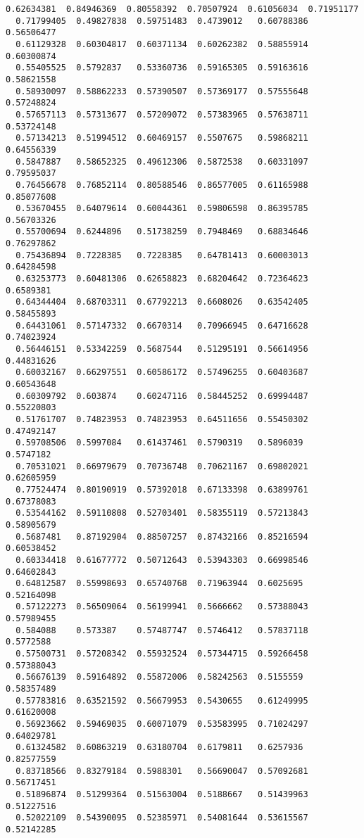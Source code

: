 \documentclass[11pt]{article}
\begin{document}
\begin{Verbatim}[commandchars=\\\{\}]
  0.62634381  0.84946369  0.80558392  0.70507924  0.61056034  0.71951177
  0.71799405  0.49827838  0.59751483  0.4739012   0.60788386  0.56506477
  0.61129328  0.60304817  0.60371134  0.60262382  0.58855914  0.60300874
  0.55405525  0.5792837   0.53360736  0.59165305  0.59163616  0.58621558
  0.58930097  0.58862233  0.57390507  0.57369177  0.57555648  0.57248824
  0.57657113  0.57313677  0.57209072  0.57383965  0.57638711  0.53724148
  0.57134213  0.51994512  0.60469157  0.5507675   0.59868211  0.64556339
  0.5847887   0.58652325  0.49612306  0.5872538   0.60331097  0.79595037
  0.76456678  0.76852114  0.80588546  0.86577005  0.61165988  0.85077608
  0.53670455  0.64079614  0.60044361  0.59806598  0.86395785  0.56703326
  0.55700694  0.6244896   0.51738259  0.7948469   0.68834646  0.76297862
  0.75436894  0.7228385   0.7228385   0.64781413  0.60003013  0.64284598
  0.63253773  0.60481306  0.62658823  0.68204642  0.72364623  0.6589381
  0.64344404  0.68703311  0.67792213  0.6608026   0.63542405  0.58455893
  0.64431061  0.57147332  0.6670314   0.70966945  0.64716628  0.74023924
  0.56446151  0.53342259  0.5687544   0.51295191  0.56614956  0.44831626
  0.60032167  0.66297551  0.60586172  0.57496255  0.60403687  0.60543648
  0.60309792  0.603874    0.60247116  0.58445252  0.69994487  0.55220803
  0.51761707  0.74823953  0.74823953  0.64511656  0.55450302  0.47492147
  0.59708506  0.5997084   0.61437461  0.5790319   0.5896039   0.5747182
  0.70531021  0.66979679  0.70736748  0.70621167  0.69802021  0.62605959
  0.77524474  0.80190919  0.57392018  0.67133398  0.63899761  0.67378083
  0.53544162  0.59110808  0.52703401  0.58355119  0.57213843  0.58905679
  0.5687481   0.87192904  0.88507257  0.87432166  0.85216594  0.60538452
  0.60334418  0.61677772  0.50712643  0.53943303  0.66998546  0.64602843
  0.64812587  0.55998693  0.65740768  0.71963944  0.6025695   0.52164098
  0.57122273  0.56509064  0.56199941  0.5666662   0.57388043  0.57989455
  0.584088    0.573387    0.57487747  0.5746412   0.57837118  0.5772588
  0.57500731  0.57208342  0.55932524  0.57344715  0.59266458  0.57388043
  0.56676139  0.59164892  0.55872006  0.58242563  0.5155559   0.58357489
  0.57783816  0.63521592  0.56679953  0.5430655   0.61249995  0.61620008
  0.56923662  0.59469035  0.60071079  0.53583995  0.71024297  0.64029781
  0.61324582  0.60863219  0.63180704  0.6179811   0.6257936   0.82577559
  0.83718566  0.83279184  0.5988301   0.56690047  0.57092681  0.56717451
  0.51896874  0.51299364  0.51563004  0.5188667   0.51439963  0.51227516
  0.52022109  0.54390095  0.52385971  0.54081644  0.53615567  0.52142285

\end{Verbatim}
\end{document}
